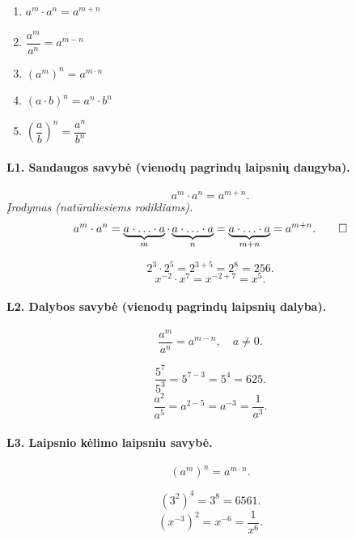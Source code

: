 \begin{tcolorbox}[title={Laipsnių savybės (santrauka)}, colback=blue!5!white,
                  colframe=blue!60!black]
\begin{enumerate}[label=\textbf{L\arabic*.}]
    \item $a^m \cdot a^n = a^{m+n}$
    \item $\dfrac{a^m}{a^n} = a^{m-n}$
    \item $(a^m)^n = a^{m \cdot n}$
    \item $(a \cdot b)^n = a^n \cdot b^n$
    \item $\left(\dfrac{a}{b}\right)^n = \dfrac{a^n}{b^n}$
\end{enumerate}
\end{tcolorbox}

\paragraph{L1. Sandaugos savybė (vienodų pagrindų laipsnių daugyba).}
\[
    a^m \cdot a^n = a^{m+n}.
\]
\textit{Įrodymas (natūraliesiems rodikliams).}
\[
    a^m \cdot a^n
    = \underbrace{a \cdot \ldots \cdot a}_{m} \cdot
      \underbrace{a \cdot \ldots \cdot a}_{n}
    = \underbrace{a \cdot \ldots \cdot a}_{m+n}
    = a^{m+n}. \qed
\]

\begin{example}
\[
    2^3 \cdot 2^5 = 2^{3+5} = 2^8 = 256.
\]
\[
    x^{-2} \cdot x^7 = x^{-2+7} = x^5.
\]
\end{example}

\paragraph{L2. Dalybos savybė (vienodų pagrindų laipsnių dalyba).}
\[
    \frac{a^m}{a^n} = a^{m-n}, \quad a \neq 0.
\]

\begin{example}
\[
    \frac{5^7}{5^3} = 5^{7-3} = 5^4 = 625.
\]
\[
    \frac{a^2}{a^5} = a^{2-5} = a^{-3} = \frac{1}{a^3}.
\]
\end{example}

\paragraph{L3. Laipsnio kėlimo laipsniu savybė.}
\[
    (a^m)^n = a^{m \cdot n}.
\]

\begin{example}
\[
    (3^2)^4 = 3^{8} = 6561.
\]
\[
    \left(x^{-3}\right)^2 = x^{-6} = \frac{1}{x^6}.
\]
\end{example}

